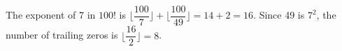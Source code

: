 The exponent of 7 in $100!$ is $\lfloor\dfrac{100}{7}\rfloor+\lfloor\dfrac{100}{49}\rfloor=14+2=16$. Since 49 is $7^2$, the number of trailing zeros is $\lfloor\dfrac{16}{2}\rfloor=\boxed8$.
